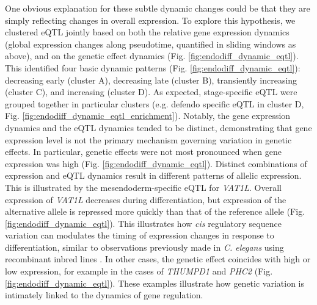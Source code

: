 
One obvious explanation for these subtle dynamic changes could be that they are simply reflecting changes in overall expression.
To explore this hypothesis, we clustered eQTL jointly based on both the relative gene expression dynamics (global expression changes along pseudotime, quantified in sliding windows as above), and on the genetic effect dynamics (Fig. \ref{fig:endodiff_dynamic_eqtl}). 
This identified four basic dynamic patterns (Fig. \ref{fig:endodiff_dynamic_eqtl}): decreasing early (cluster A), decreasing late (cluster B), transiently increasing (cluster C), and increasing (cluster D). 
As expected, stage-specific eQTL were grouped together in particular clusters (e.g. defendo specific eQTL in cluster D, Fig. \ref{fig:endodiff_dynamic_eqtl_enrichment}). 
Notably, the gene expression dynamics and the eQTL dynamics tended to be distinct, demonstrating that gene expression level is not the primary mechanism governing variation in genetic effects. 
In particular, genetic effects were not most pronounced when gene expression was high (Fig. \ref{fig:endodiff_dynamic_eqtl}).
Distinct combinations of expression and eQTL dynamics result in different patterns of allelic expression. 
This is illustrated by the mesendoderm-specific eQTL for \textit{VAT1L}. 
Overall expression of \textit{VAT1L} decreases during differentiation, but expression of the alternative allele is repressed more quickly than that of the reference allele (Fig. \ref{fig:endodiff_dynamic_eqtl}). 
This illustrates how \textit{cis} regulatory sequence variation can modulates the timing of expression changes in response to differentiation, similar to observations previously made in \textit{C. elegans} using recombinant inbred lines \cite{francesconi2014effects}. 
In other cases, the genetic effect coincides with high or low expression, for example in the cases of \textit{THUMPD1} and \textit{PHC2} (Fig. \ref{fig:endodiff_dynamic_eqtl}). 
These examples illustrate how genetic variation is intimately linked to the dynamics of gene regulation.

